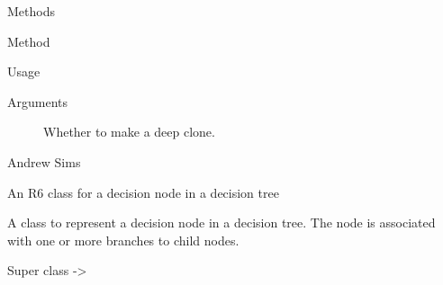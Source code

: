 \documentclass[a4paper]{book}
\begin{document}
\begin{Section}{Methods}
\begin{SubSection}{Method }
\begin{SubSubSection}{Usage}
\end{SubSubSection}


%
\begin{SubSubSection}{Arguments}

\begin{description}

\item[] Whether to make a deep clone.

\end{description}


\end{SubSubSection}

\end{SubSection}

\end{Section}
%
\begin{Author}\relax
Andrew Sims 
\end{Author}
%
\begin{Description}\relax
An R6 class for a decision node in a decision tree
\end{Description}
%
\begin{Details}\relax
A class to represent a decision node in a decision tree. The node
is associated with one or more branches to child nodes.
\end{Details}
%
\begin{Section}{Super class}
 -> 
\end{Section}
%
\end{document}
